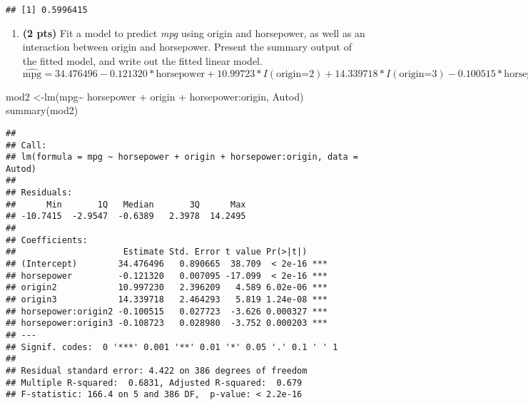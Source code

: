 \documentclass[
]{article}
\newenvironment{Shaded}{\begin{snugshade}}{\end{snugshade}}
\newcommand{\FunctionTok}[1]{\textcolor[rgb]{0.00,0.00,0.00}{#1}}
\newcommand{\NormalTok}[1]{#1}
\newcommand{\OtherTok}[1]{\textcolor[rgb]{0.56,0.35,0.01}{#1}}
\newcommand{\SpecialCharTok}[1]{\textcolor[rgb]{0.00,0.00,0.00}{#1}}
\providecommand{\tightlist}{%
  \setlength{\itemsep}{0pt}\setlength{\parskip}{0pt}}
\begin{document}
\begin{verbatim}
## [1] 0.5996415
\end{verbatim}

\begin{enumerate}
\def\labelenumi{(\alph{enumi})}
\setcounter{enumi}{4}
\tightlist
\item
  \textbf{(2 pts)} Fit a model to predict \emph{mpg} using origin and
  horsepower, as well as an interaction between origin and horsepower.
  Present the summary output of the fitted model, and write out the
  fitted linear model.
  \[\hat{\text{mpg}}=34.476496-0.121320*\text{horsepower}+10.99723*I(\text{origin=2})+14.339718*I(\text{origin=3})-0.100515*\text{horsepower}*I(\text{origin=2})-0.108723*\text{horsepower}*I(\text{origin=3}).\]
\end{enumerate}

\begin{Shaded}
\begin{Highlighting}[]
\NormalTok{mod2 }\OtherTok{\textless{}{-}}\FunctionTok{lm}\NormalTok{(mpg}\SpecialCharTok{\textasciitilde{}}\NormalTok{ horsepower }\SpecialCharTok{+}\NormalTok{ origin }\SpecialCharTok{+}\NormalTok{ horsepower}\SpecialCharTok{:}\NormalTok{origin, Autod)}
\FunctionTok{summary}\NormalTok{(mod2)}
\end{Highlighting}
\end{Shaded}

\begin{verbatim}
## 
## Call:
## lm(formula = mpg ~ horsepower + origin + horsepower:origin, data = Autod)
## 
## Residuals:
##      Min       1Q   Median       3Q      Max 
## -10.7415  -2.9547  -0.6389   2.3978  14.2495 
## 
## Coefficients:
##                     Estimate Std. Error t value Pr(>|t|)    
## (Intercept)        34.476496   0.890665  38.709  < 2e-16 ***
## horsepower         -0.121320   0.007095 -17.099  < 2e-16 ***
## origin2            10.997230   2.396209   4.589 6.02e-06 ***
## origin3            14.339718   2.464293   5.819 1.24e-08 ***
## horsepower:origin2 -0.100515   0.027723  -3.626 0.000327 ***
## horsepower:origin3 -0.108723   0.028980  -3.752 0.000203 ***
## ---
## Signif. codes:  0 '***' 0.001 '**' 0.01 '*' 0.05 '.' 0.1 ' ' 1
## 
## Residual standard error: 4.422 on 386 degrees of freedom
## Multiple R-squared:  0.6831, Adjusted R-squared:  0.679 
## F-statistic: 166.4 on 5 and 386 DF,  p-value: < 2.2e-16
\end{verbatim}
\end{document}
